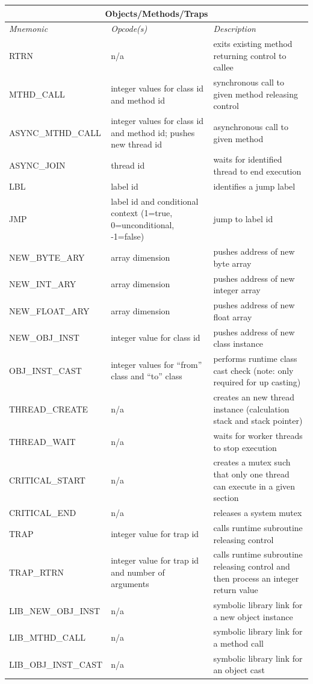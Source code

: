 \documentclass[12pt]{article}
\begin{document}
\begin{center}
{{\vspace{\baselineskip}
\begin{tabular}{| l | p{4 cm} | p{6 cm} |}
\hline
\multicolumn{3}{|c|}{\textbf{Objects/Methods/Traps}} \\
\hline
\emph{Mnemonic}  &  \emph{Opcode(s)}  &  \emph{Description} \\ \hline \hline
RTRN & n/a & exits existing method returning control to callee \\ \hline
MTHD\_CALL & integer values for class id and method id & synchronous call to given method releasing control \\ \hline
ASYNC\_MTHD\_CALL & integer values for class id and method id; pushes new thread id & asynchronous call to given method \\ \hline
ASYNC\_JOIN & thread id & waits for identified thread to end execution \\ \hline
LBL & label id & identifies a jump label \\ \hline
JMP & label id and conditional context (1=true, 0=unconditional, -1=false) & jump to label id \\ \hline
NEW\_BYTE\_ARY & array dimension & pushes address of new byte array \\ \hline
NEW\_INT\_ARY & array dimension & pushes address of new integer array \\ \hline
NEW\_FLOAT\_ARY & array dimension & pushes address of new float array \\ \hline
NEW\_OBJ\_INST & integer value for class id & pushes address of new class instance \\ \hline
OBJ\_INST\_CAST & integer values for ``from'' class and ``to'' class & performs runtime class cast check (note: only required for up casting) \\ \hline
THREAD\_CREATE & n/a & creates an new thread instance (calculation stack and  stack pointer) \\ \hline
THREAD\_WAIT & n/a & waits for worker threads to stop execution \\ \hline
CRITICAL\_START & n/a & creates a mutex such that only one thread can execute in a given section \\ \hline
CRITICAL\_END & n/a & releases a system mutex \\ \hline
TRAP & integer value for trap id & calls runtime subroutine releasing control \\ \hline
TRAP\_RTRN & integer value for trap id and number of arguments & calls runtime subroutine releasing control and then process an integer return value \\ \hline
LIB\_NEW\_OBJ\_INST & n/a & symbolic library link for a new object instance  \\ \hline
LIB\_MTHD\_CALL & n/a & symbolic library link for a method call  \\ \hline
LIB\_OBJ\_INST\_CAST & n/a & symbolic library link for an object cast  \\ \hline
\end{tabular}
}}
\end{center}
\end{document}
